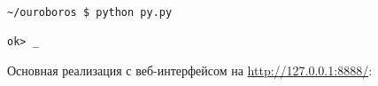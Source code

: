 \clearpage
{}

\begin{verbatim}
~/ouroboros $ python py.py

ok> _
\end{verbatim}

\noindent
Основная реализация с веб-интерфейсом на \url{http://127.0.0.1:8888/}:

\medskip
{}

\clearpage
{}
